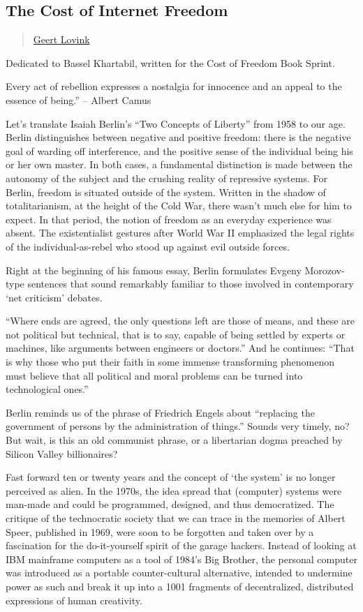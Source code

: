 \subsection{The Cost of Internet
Freedom}\label{the-cost-of-internet-freedom}

\begin{quote}
\href{../appendix/attributions.html\#geert-lovink}{Geert Lovink}
\end{quote}

Dedicated to Bassel Khartabil, written for the Cost of Freedom Book
Sprint.

Every act of rebellion expresses a nostalgia for innocence and an appeal
to the essence of being.'' -- Albert Camus

Let's translate Isaiah Berlin's ``Two Concepts of Liberty'' from 1958 to
our age. Berlin distinguishes between negative and positive freedom:
there is the negative goal of warding off interference, and the positive
sense of the individual being his or her own master. In both cases, a
fundamental distinction is made between the autonomy of the subject and
the crushing reality of repressive systems. For Berlin, freedom is
situated outside of the system. Written in the shadow of
totalitarianism, at the height of the Cold War, there wasn't much else
for him to expect. In that period, the notion of freedom as an everyday
experience was absent. The existentialist gestures after World War II
emphasized the legal rights of the individual-as-rebel who stood up
against evil outside forces.

Right at the beginning of his famous essay, Berlin formulates Evgeny
Morozov-type sentences that sound remarkably familiar to those involved
in contemporary `net criticism' debates.

``Where ends are agreed, the only questions left are those of means, and
these are not political but technical, that is to say, capable of being
settled by experts or machines, like arguments between engineers or
doctors.'' And he continues: ``That is why those who put their faith in
some immense transforming phenomenon must believe that all political and
moral problems can be turned into technological ones.''

Berlin reminds us of the phrase of Friedrich Engels about ``replacing
the government of persons by the administration of things.'' Sounds very
timely, no? But wait, is this an old communist phrase, or a libertarian
dogma preached by Silicon Valley billionaires?

Fast forward ten or twenty years and the concept of `the system' is no
longer perceived as alien. In the 1970s, the idea spread that (computer)
systems were man-made and could be programmed, designed, and thus
democratized. The critique of the technocratic society that we can trace
in the memories of Albert Speer, published in 1969, were soon to be
forgotten and taken over by a fascination for the do-it-yourself spirit
of the garage hackers. Instead of looking at IBM mainframe computers as
a tool of 1984's Big Brother, the personal computer was introduced as a
portable counter-cultural alternative, intended to undermine power as
such and break it up into a 1001 fragments of decentralized, distributed
expressions of human creativity.

